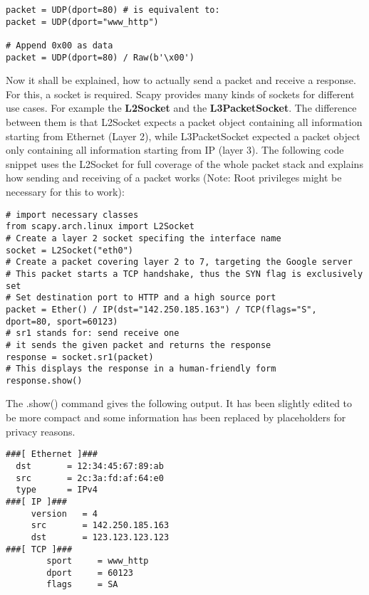 \begin{samepage}
\begin{verbatim}
packet = UDP(dport=80) # is equivalent to:
packet = UDP(dport="www_http")

# Append 0x00 as data
packet = UDP(dport=80) / Raw(b'\x00')
\end{verbatim}
\end{samepage}

Now it shall be explained, how to actually send a packet and receive a response. For this, a socket is required. Scapy provides many kinds of sockets for different use cases. For example the \textbf{L2Socket} and the \textbf{L3PacketSocket}. The difference between them is that L2Socket expects a packet object containing all information starting from Ethernet (Layer 2), while L3PacketSocket expected a packet object only containing all information starting from IP (layer 3). The following code snippet uses the L2Socket for full coverage of the whole packet stack and explains how sending and receiving of a packet works (Note: Root privileges might be necessary for this to work):

\begin{samepage}
\begin{verbatim}
# import necessary classes
from scapy.arch.linux import L2Socket
# Create a layer 2 socket specifing the interface name
socket = L2Socket("eth0")
# Create a packet covering layer 2 to 7, targeting the Google server
# This packet starts a TCP handshake, thus the SYN flag is exclusively set
# Set destination port to HTTP and a high source port
packet = Ether() / IP(dst="142.250.185.163") / TCP(flags="S", dport=80, sport=60123)
# sr1 stands for: send receive one
# it sends the given packet and returns the response
response = socket.sr1(packet)
# This displays the response in a human-friendly form
response.show()
\end{verbatim}
\end{samepage}

The .show() command gives the following output. It has been slightly edited to be more compact and some information has been replaced by placeholders for privacy reasons.

\begin{samepage}
\begin{verbatim}
###[ Ethernet ]### 
  dst       = 12:34:45:67:89:ab
  src       = 2c:3a:fd:af:64:e0
  type      = IPv4
###[ IP ]### 
     version   = 4
     src       = 142.250.185.163
     dst       = 123.123.123.123
###[ TCP ]### 
        sport     = www_http
        dport     = 60123
        flags     = SA
\end{verbatim}
\end{samepage}

